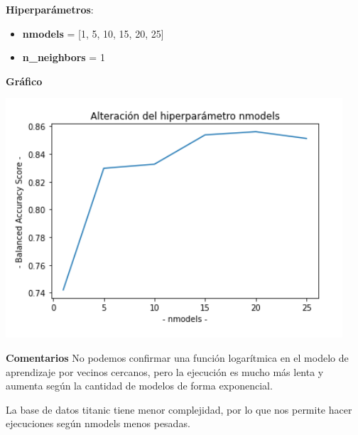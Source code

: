 \documentclass[conference,a4paper]{IEEEtran}
\begin{document}
\begin{textb}
    \textbf{Hiperparámetros}:
  \begin{itemize}
      \item \textbf{nmodels} = [1, 5, 10, 15, 20, 25]
      \item \textbf{n\_neighbors} = 1
  \end{itemize}
  \textbf{Gráfico}
  
  \begin{center}
    \includegraphics[scale=0.70]{figures/nmodels_adultDataset_knn.png}
    \label{fig:funcion_clasificacion}
  \end{center}
  
  \textbf{Comentarios} No podemos confirmar una función logarítmica en el modelo de aprendizaje por vecinos cercanos, pero la ejecución es mucho más lenta y aumenta según la cantidad de modelos de forma exponencial.
\end{textb}

La base de datos titanic tiene menor complejidad, por lo que nos permite hacer ejecuciones según nmodels menos pesadas. \\
\end{document}
